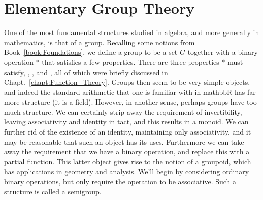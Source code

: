 \begingroup
    \ifcsname\PATH\endcsname
        \newcommand{\PATH}{books/Algebra/Group_Theory}
        \newcommand{\OLDPATH}{\PATH}
    \else
        \newcommand{\OLDPATH}{\PATH}
        \renewcommand{\PATH}{books/Algebra/Group_Theory}
    \fi
    \chapter{Elementary Group Theory}
        One of the most fundamental structures studied in algebra, and more
        generally in mathematics, is that of a \gls{group}.
        Recalling some notions from Book~\ref{book:Foundations}, we define a
        group to be a \gls{set} $G$ together with a
        \gls{binary operation} $*$ that satisfies a few
        properties. There are three properties $*$ must satisfy,
        ,
        , and
        ,
        all of which were briefly discussed in
        Chapt.~\ref{chapt:Function_Theory}. Groups then seem to be very simple
        objects, and indeed the standard arithmetic that one is
        familiar with in \gls{mathbbR} has far more structure (it is a
        \gls{field}). However, in another sense, perhaps groups
        have too much structure. We can certainly strip away the requirement of
        invertibility, leaving associativity and identity in tact, and this
        results in a \gls{monoid}. We can further rid of the
        existence of an identity, maintaining only associativity, and it may be
        reasonable that such an object has its uses. Furthermore we can take
        away the requirement that we have a binary operation, and replace this
        with a partial function. This latter object
        gives rise to the notion of a groupoid, which has
        applications in geometry and analysis. We'll begin by considering
        ordinary binary operations, but only require the operation to be
        associative. Such a structure is called a
        \gls{semigroup}.
        
        
        
        
